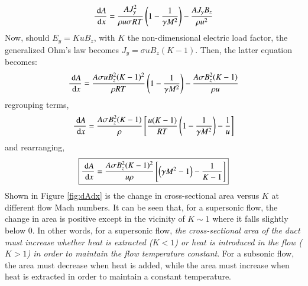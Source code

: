\documentclass{warpdoc}
\newcommand\frameeqn[1]{\fbox{$\displaystyle #1$}}
\newcommand{\ordi}{\; {\rm d}}
\begin{document}
%
%
\begin{equation}
\frac{\ordi A }{\ordi x} =
                \frac{A J^2_y}{\rho u\sigma RT} \left( 1-\frac{1}{\gamma M^2}\right)
              - \frac{A J_y B_z}{\rho u^2}
\end{equation}
%
Now, should $E_y=K u B_z$, with $K$  the non-dimensional electric load factor, the generalized
Ohm's law becomes $J_y=\sigma u B_z (K-1)$. Then, the latter equation becomes:
%
\begin{equation}
\frac{\ordi A }{\ordi x} =
                \frac{A\sigma u B_z^2 (K-1)^2}{\rho RT} \left( 1-\frac{1}{\gamma M^2}\right)
              - \frac{A\sigma B_z^2 (K-1)}{\rho u}
\end{equation}
%
regrouping terms,
%
\begin{equation}
\frac{\ordi A }{\ordi x} =
            \frac{A\sigma B_z^2 (K-1)}{\rho}\left[
                \frac{u (K-1)}{RT} \left( 1-\frac{1}{\gamma M^2}\right)
              - \frac{1}{u}
            \right]
\end{equation}
%
and rearranging,
%
\begin{equation}
\frameeqn{
  \frac{\ordi A }{\ordi x} =
            \frac{A\sigma B^2_z (K-1)^2}{u \rho}\left[
              \left( \gamma M^2-1\right)
              - \frac{1}{K-1}
            \right]
}
\end{equation}
%
Shown in Figure \ref{fig:dAdx} is the change in cross-sectional area versus $K$ at different
flow Mach numbers. It can be seen that, for a supersonic flow, the change in area is
positive except in the vicinity of $K\sim 1$ where it falls slightly below 0. In other words,
for a supersonic flow, \emph{the cross-sectional area of the duct must increase whether
heat is extracted ($K<1$) or heat is introduced in the flow ($K>1$) in order to maintain
the flow temperature constant}. For a subsonic flow, the area must decrease when heat is added,
while the area must increase when heat is extracted in order to maintain a constant temperature.









\end{document}
